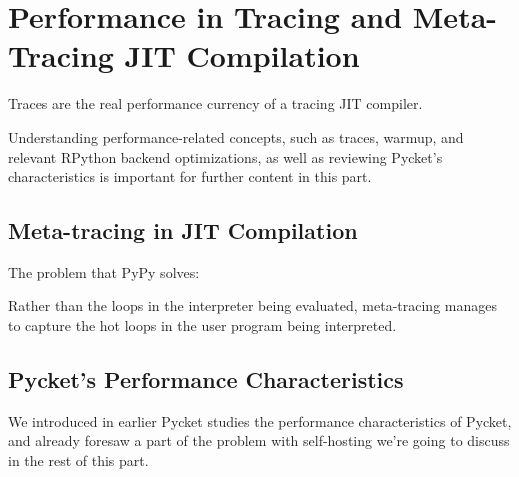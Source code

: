 \chapter{Performance in Tracing and Meta-Tracing JIT Compilation}

    \begin{chapterpoint}
        Traces are the real performance currency of a tracing JIT compiler.

        Understanding performance-related concepts, such as traces, warmup, and relevant RPython backend optimizations, as well as reviewing Pycket's characteristics is important for further content in this part.
    \end{chapterpoint}

    \section{Meta-tracing in JIT Compilation}
        \begin{mainpoint}
            The problem that PyPy solves:

            Rather than the loops in the interpreter being evaluated, meta-tracing manages to capture the hot loops in the user program being interpreted.
        \end{mainpoint}

    \section{Pycket's Performance Characteristics}
        \begin{mainpoint}
            We introduced in earlier Pycket studies the performance characteristics of Pycket, and already foresaw a part of the problem with self-hosting we're going to discuss in the rest of this part.
        \end{mainpoint}


